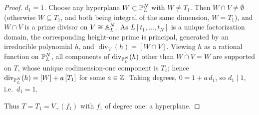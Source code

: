 \begin{proof}
    \emph{$d_1 = 1$.} Choose any hyperplane $W \subset \mathbb{P}^N_L$ with $W \neq T_1$. Then
    $W \cap V \neq \emptyset$ (otherwise $W \subseteq T_1$, and both being integral of the same
    dimension, $W = T_1$), and $W \cap V$ is a prime divisor on $V \cong \mathbb{A}^N_L$. As
    $L[t_1, \dots, t_N]$ is a unique factorization domain, the corresponding height-one prime
    is principal, generated by an irreducible polynomial $h$, and
    $\operatorname{div}_V(h) = [W \cap V]$. Viewing $h$ as a rational function on $\mathbb{P}^N_L$,
    all components of $\operatorname{div}_{\mathbb{P}^N_L}(h)$ other than $\overline{W \cap V} = W$
    are supported on $T$, whose unique codimension-one component is $T_1$; hence
    $\operatorname{div}_{\mathbb{P}^N_L}(h) = [W] + a\,[T_1]$ for some $a \in \mathbb{Z}$. Taking degrees,
    $0 = 1 + a\, d_1$, so $d_1 \mid 1$, i.e.\ $d_1 = 1$.

    Thus $T = T_1 = V_+(f_1)$ with $f_1$ of degree one: a hyperplane.
\end{proof}


